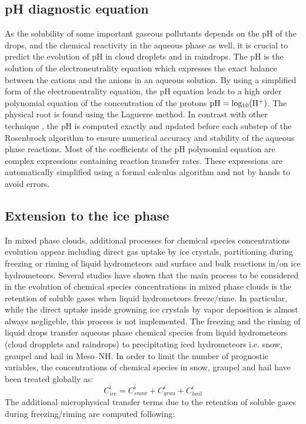\subsection{pH diagnostic equation}
As the solubility of some important gaseous pollutants depends on the pH of the drops, and the chemical reactivity in the aqueous phase as well, it is crucial to predict the evolution of pH in cloud droplets and in raindrops. The pH is the solution of the electroneutrality equation which expresses the exact balance between the cations and the anions in an aqueous solution. By using a simplified form of the electroneutrality equation, the pH equation leads to a high order polynomial equation of the concentration of the protons $\rm{pH} = log_{10}(H^{+})$. The physical root is found using the Laguerre method. In contrast with other technique \citep{Barth2007}, the pH is computed exactly and updated before each substep of the Rosenbrock algorithm to ensure numerical accuracy and stability of the aqueous phase reactions. Most of the coefficients of the pH polynomial equation are complex expressions containing reaction transfer rates. These expressions are automatically simplified using a formal calculus algorithm and not by hands to avoid errors.


\subsection{Extension to the ice phase}
In mixed phase clouds, additional processes for chemical species concentrations evolution appear including direct gas uptake by ice crystals, partitioning during freezing or riming of liquid hydrometeors and surface and bulk reactions in/on ice hydrometeors. Several studies have shown \citep{Yin2002,Long2010} that the main process to be considered in the evolution of chemical species concentrations in mixed phase clouds is the retention of soluble gases when liquid hydrometeors freeze/rime. In particular, while the direct uptake inside growning ice crystals by vapor deposition is almost always negligeble, this process is not implemented. The freezing and the riming of liquid drops transfer aqueous phase chemical species from liquid hydrometeors (cloud dropplets and raindrops) to precipitating iced hydrometeors i.e. snow, graupel and hail in Meso--NH. In order to limit the number of prognostic variables, the concentrations of chemical species in snow, graupel and hail have been treated globally as:
\begin{equation}
C_{ice}^{i}=C_{snow}^{i}+C_{grau}^{i}+C_{hail}^{i}
\end{equation}
The additional microphysical transfer terms due to the retention of soluble gases during freezing/riming are computed following:

